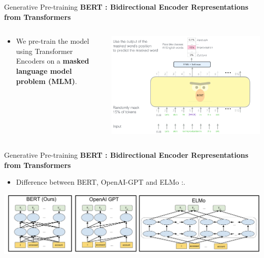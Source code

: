 \documentclass[aspectratio=169]{beamer}
\begin{document}
\begin{frame}{Generative Pre-training}
\centering
\textbf{BERT : Bidirectional Encoder Representations from Transformers \cite{devlin2018bert}}

\begin{columns}
\begin{column}{0.3\textwidth}
\begin{itemize}
	\item We pre-train the model using Transformer Encoders on a \textbf{masked language model problem (MLM)}.
\end{itemize}
   
\end{column}
\begin{column}{0.7\textwidth}  %
    \centering

\includegraphics[width=\textwidth]{figures/BERT-language-modeling-masked-lm}

\end{column}
\end{columns}

\end{frame}

\begin{frame}{Generative Pre-training}
\centering
\textbf{BERT : Bidirectional Encoder Representations from Transformers \cite{devlin2018bert}}

\begin{itemize}
	\item Difference between BERT, OpenAI-GPT and ELMo :.
\end{itemize}

\includegraphics[width=\textwidth]{figures/bert_gpt_elmo_comparison}
\end{frame}
\end{document}
